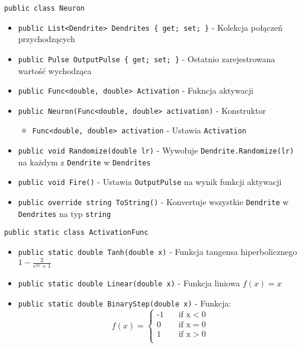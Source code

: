 \documentclass[12pt,a4paper]{article}
\begin{document}
\lstinline{public class Neuron}
\begin{itemize}
    \item \lstinline|public List<Dendrite> Dendrites { get; set; }| - Kolekcja połączeń przychodzących
    \item \lstinline|public Pulse OutputPulse { get; set; }| - Ostatnio zarejestrowana wartość wychodząca
    \item \lstinline|public Func<double, double> Activation| - Fukncja aktywacji
    \item \lstinline|public Neuron(Func<double, double> activation)| - Konstruktor
          \begin{itemize}
              \item \lstinline{Func<double, double> activation} - Ustawia \lstinline{Activation}
          \end{itemize}
    \item \lstinline|public void Randomize(double lr)| - Wywołuje \lstinline{Dendrite.Randomize(lr)} na każdym z \lstinline{Dendrite} w \lstinline{Dendrites}
    \item \lstinline|public void Fire()| - Ustawia \lstinline{OutputPulse} na wynik funkcji aktywacji
    \item \lstinline|public override string ToString()| - Konvertuje wszystkie \lstinline{Dendrite} w \lstinline{Dendrites} na typ \lstinline{string}
\end{itemize}


\lstinline{public static class ActivationFunc}
\begin{itemize}
    \item \lstinline|public static double Tanh(double x)| - Funkcja tangensa hiperbolicznego $1 - \frac{2}{e^{2x} + 1}$
    \item \lstinline|public static double Linear(double x)| - Funkcja liniowa $f(x) = x$
    \item \lstinline|public static double BinaryStep(double x)| - Funkcja: \[   
        f(x) = 
             \begin{cases}
               \text{-1} &\quad\text{if x} < 0\\
               \text{0} &\quad\text{if x} = 0\\
               \text{1} &\quad\text{if x} > 0\\
             \end{cases}
        \]
\end{itemize}
\end{document}
